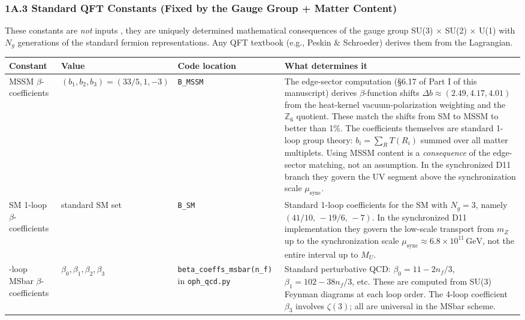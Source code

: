 \subsubsection{1A.3 Standard QFT Constants (Fixed by the Gauge Group + Matter Content)}\label{1a3-standard-qft-constants-fixed-by-the-gauge-group--matter-content}

These constants are \emph{not} inputs , they are uniquely determined mathematical consequences of the gauge group SU(3) \(\times\) SU(2) \(\times\) U(1) with \(N_g\) generations of the standard fermion representations. Any QFT textbook (e.g., Peskin \& Schroeder) derives them from the Lagrangian.

{\def\LTcaptype{none} %
\setlength{\LTleft}{0pt}
\setlength{\LTright}{0pt}
\setlength{\tabcolsep}{1.2pt}
\renewcommand{\arraystretch}{1.05}
\footnotesize
\begin{longtable}[]{@{}>{\RaggedRight\arraybackslash}p{}>{\RaggedRight\arraybackslash}p{}>{\RaggedRight\arraybackslash}p{}>{\RaggedRight\arraybackslash}p{}@{}}
\toprule\noalign{}
Constant & Value & Code location & What determines it \\
\midrule\noalign{}
\endhead
\bottomrule\noalign{}
\endlastfoot
MSSM \(\beta\)-coefficients & \((b_1, b_2, b_3) = (33/5, 1, -3)\) & \texttt{B\_MSSM} & The edge-sector computation (§6.17 of Part I of this manuscript) derives \(\beta\)-function shifts \(\Delta b \approx (2.49, 4.17, 4.01)\) from the heat-kernel vacuum-polarization weighting and the \(\mathbb{Z}_6\) quotient. These match the shifts from SM to MSSM to better than 1\%. The coefficients themselves are standard 1-loop group theory: \(b_i = \sum_R T(R_i)\) summed over all matter multiplets. Using MSSM content is a \emph{consequence} of the edge-sector matching, not an assumption. In the synchronized D11 branch they govern the UV segment above the synchronization scale \(\mu_{\mathrm{sync}}\). \\
SM 1-loop \(\beta\)-coefficients & standard SM set & \texttt{B\_SM} & Standard 1-loop coefficients for the SM with \(N_g = 3\), namely \((41/10,\,-19/6,\,-7)\). In the synchronized D11 implementation they govern the low-scale transport from \(m_Z\) up to the synchronization scale \(\mu_{\mathrm{sync}}\approx 6.8\times 10^{11}\,\mathrm{GeV}\), not the entire interval up to \(M_U\). \\
4-loop MSbar \(\beta\)-coefficients & \(\beta_0, \beta_1, \beta_2, \beta_3\) & \texttt{beta\_\allowbreak coeffs\_\allowbreak msbar(n\_\allowbreak f)} in \texttt{oph\_\allowbreak qcd.py} & Standard perturbative QCD: \(\beta_0 = 11 - 2n_f/3\), \(\beta_1 = 102 - 38n_f/3\), etc. These are computed from SU(3) Feynman diagrams at each loop order. The 4-loop coefficient \(\beta_3\) involves \(\zeta(3)\); all are universal in the MSbar scheme. \\

\end{longtable}}
